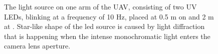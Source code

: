 \begin{figure}[htbp]
	\centering
	\caption{
  The light source on one arm of the UAV, consisting of two UV LEDs, blinking at a frequency of 10 Hz,
  placed at 0.5 m on  and 2 m at . Star-like shape of
  the led source is caused by light diffraction that is happening when the intense
  monochromatic light enters the camera lens aperture.
  }
	\label{fig:leds}
\end{figure}